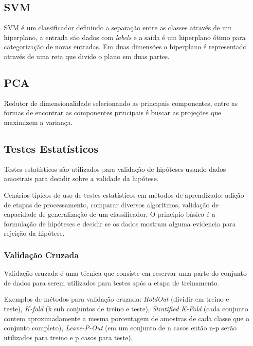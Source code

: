 \documentclass[12pt]{article}
\begin{document}
\subsection{SVM}

	SVM é um classificador definindo a separação entre as classes através de um hiperplano, a entrada são dados com \emph{labels} e a saída é um hiperplano ótimo para categorização de novas entradas. Em duas dimensões o hiperplano é representado através de uma reta que divide o plano em duas partes.
	
\subsection{PCA}

	Redutor de dimensionalidade selecionando as principais componentes, entre as formas de encontrar as componentes principais é buscar as projeções que maximizem a variança.
	
\subsection{Testes Estatísticos}

	Testes estatísticos são utilizados para validação de hipóteses usando dados amostrais para decidir sobre a validade da hipótese.
	
	Cenários típicos de uso de testes estatísticos em métodos de aprendizado: adição de etapas de processamento, comparar diversos algoritmos, validação de capacidade de generalização de um classificador. O principio básico é a formulação de hipóteses e decidir se os dados mostram alguma evidencia para rejeição da hipótese.

	\subsubsection{Validação Cruzada}
		
		Validação cruzada é uma técnica que consiste em reservar uma parte do conjunto de dados para serem utilizados para testes após a etapa de treinamento.
		
		Exemplos de métodos para validação cruzada: \emph{HoldOut} (dividir em treino e teste), \emph{K-fold} (k sub conjuntos de treino e teste), \emph{Stratified K-Fold} (cada conjunto contem aproximadamente a mesma porcentagem de amostras de cada classe que o conjunto completo), \emph{Leave-P-Out} (em um conjunto de n casos então n-p serão utilizados para treino e p casos para teste).
		
\end{document}
